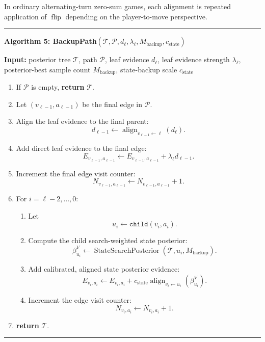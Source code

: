 \documentclass[11pt]{article}
\newcommand{\Tree}{\mathcal{T}}
\newcommand{\Path}{\mathcal{P}}
\newcommand{\Flip}{\operatorname{flip}}
\newcommand{\Align}{\operatorname{align}}
\newcommand{\StateSearchPosterior}{\operatorname{StateSearchPosterior}}
\newenvironment{algorithmblock}[1]
{
  \par\medskip
  \noindent\hrule\par\smallskip
  \noindent\textbf{#1}
  \par\smallskip
}
{
  \par\smallskip\noindent\hrule\par\medskip
}
\newcommand{\Input}{\textbf{Input: }}
\newcommand{\Return}{\textbf{return }}
\begin{document}
In ordinary alternating-turn zero-sum games, each alignment is repeated
application of \(\Flip\) depending on the player-to-move perspective.

\begin{algorithmblock}{Algorithm 5: BackupPath\((\Tree,\Path,d_\ell,\lambda_\ell,M_{\mathrm{backup}},c_{\mathrm{state}})\)}

\Input posterior tree \(\Tree\), path \(\Path\), leaf evidence \(d_\ell\), leaf evidence strength \(\lambda_\ell\), posterior-best sample count \(M_{\mathrm{backup}}\), state-backup scale \(c_{\mathrm{state}}\)

\begin{enumerate}[leftmargin=2em]
  \item If \(\Path\) is empty, \Return \(\Tree\).

  \item Let \((v_{\ell-1},a_{\ell-1})\) be the final edge in \(\Path\).

  \item Align the leaf evidence to the final parent:
  \[
  d_{\ell-1}
  \gets
  \Align_{v_{\ell-1}\leftarrow \ell}(d_\ell).
  \]

  \item Add direct leaf evidence to the final edge:
  \[
  E_{v_{\ell-1},a_{\ell-1}}
  \gets
  E_{v_{\ell-1},a_{\ell-1}}
  +
  \lambda_\ell d_{\ell-1}.
  \]

  \item Increment the final edge visit counter:
  \[
  N_{v_{\ell-1},a_{\ell-1}}
  \gets
  N_{v_{\ell-1},a_{\ell-1}}+1.
  \]

  \item For \(i=\ell-2,\ldots,0\):
  \begin{enumerate}[leftmargin=2em]
    \item Let
    \[
    u_i \gets \texttt{child}(v_i,a_i).
    \]

    \item Compute the child search-weighted state posterior:
    \[
    \beta^V_{u_i}
    \gets
    \StateSearchPosterior(\Tree,u_i,M_{\mathrm{backup}}).
    \]

    \item Add calibrated, aligned state posterior evidence:
    \[
    E_{v_i,a_i}
    \gets
    E_{v_i,a_i}
    +
    c_{\mathrm{state}}
    \Align_{v_i\leftarrow u_i}
    \left(
    \beta^V_{u_i}
    \right).
    \]

    \item Increment the edge visit counter:
    \[
    N_{v_i,a_i}
    \gets
    N_{v_i,a_i}+1.
    \]
  \end{enumerate}

  \item \Return \(\Tree\).
\end{enumerate}

\end{algorithmblock}
\end{document}
